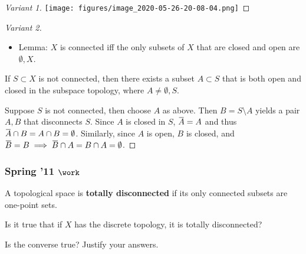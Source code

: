 \begin{solution}
\begin{proof}[Variant 1]
\texttt{[image: figures/image\_2020-05-26-20-08-04.png]}

\end{proof}

\begin{proof}[Variant 2]

\envlist

\begin{concept}

\envlist

\begin{itemize}
\tightlist
\item
  Lemma: \(X\) is connected iff the only subsets of \(X\) that are
  closed and open are \(\emptyset, X\).
\end{itemize}

\end{concept}

If \(S\subset X\) is not connected, then there exists a subset
\(A\subset S\) that is both open and closed in the subspace topology,
where \(A\neq \emptyset, S\).

Suppose \(S\) is not connected, then choose \(A\) as above. Then
\(B = S\setminus A\) yields a pair \(A, B\) that disconnects \(S\).
Since \(A\) is closed in \(S\),
\(\mkern 1.5mu\overline{\mkern-1.5muA\mkern-1.5mu}\mkern 1.5mu = A\) and
thus
\(\mkern 1.5mu\overline{\mkern-1.5muA\mkern-1.5mu}\mkern 1.5mu \cap B = A \cap B = \emptyset\).
Similarly, since \(A\) is open, \(B\) is closed, and
\(\mkern 1.5mu\overline{\mkern-1.5muB\mkern-1.5mu}\mkern 1.5mu = B \implies \mkern 1.5mu\overline{\mkern-1.5muB\mkern-1.5mu}\mkern 1.5mu \cap A = B \cap A = \emptyset\).

\end{proof}

\end{solution}

\hypertarget{spring-11-work}{%
\subsubsection{\texorpdfstring{Spring '11
\(\work\)}{Spring '11 \textbackslash work}}\label{spring-11-work}}

\begin{problem}[?]

A topological space is \textbf{totally disconnected} if its only
connected subsets are one-point sets.

Is it true that if \(X\) has the discrete topology, it is totally
disconnected?

Is the converse true? Justify your answers.

\end{problem}

